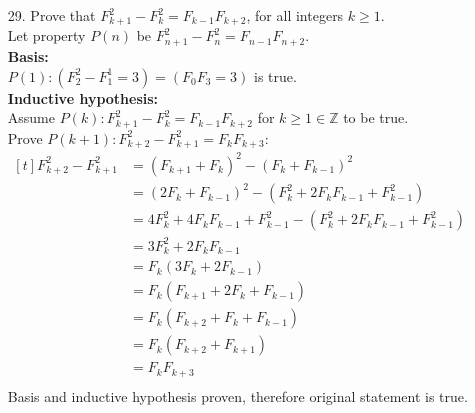 \documentclass[letterpaper,fleqn,leqno]{article}
\begin{document}
\begin{enumerate}[(a)]
{\begin{enumerate}
				\item [29.]
				Prove that $F^2_{k+1}-F^2_k=F_{k-1}F_{k+2}$, for all integers $k\geq1$. \\
				Let property $P(n)$ be $F^2_{n+1}-F^2_n=F_{n-1}F_{n+2}$. \\
				\textbf{Basis:} \\
				$P(1): (F^2_2-F^1_1=3)=(F_0F_3=3)$ is true. \\
				\textbf{Inductive hypothesis:} \\
				Assume $P(k): F^2_{k+1}-F^2_k=F_{k-1}F_{k+2}$ for $k\geq1\in\mathbb{Z}$ to be true. \\
				Prove $P(k+1): F^2_{k+2}-F^2_{k+1}=F_kF_{k+3}$: \\
				$\begin{aligned}[t]
					F^2_{k+2}-F^2_{k+1} &= (F_{k+1}+F_k)^2-(F_k+F_{k-1})^2 \\
					&= (2F_k+F_{k-1})^2-(F^2_k+2F_kF_{k-1}+F^2_{k-1}) \\
					&= 4F^2_k+4F_kF_{k-1}+F^2_{k-1}-(F^2_k+2F_kF_{k-1}+F^2_{k-1}) \\
					&= 3F^2_k+2F_kF_{k-1} \\
					&= F_k(3F_k+2F_{k-1}) \\
					&= F_k(F_{k+1}+2F_k+F_{k-1}) \\
					&= F_k(F_{k+2}+F_k+F_{k-1}) \\
					&= F_k(F_{k+2}+F_{k+1}) \\
					&= F_kF_{k+3} \\
				\end{aligned}$ \\
				Basis and inductive hypothesis proven, therefore original statement is true. \\
			\end{enumerate}
		}
\end{enumerate}
\end{document}

